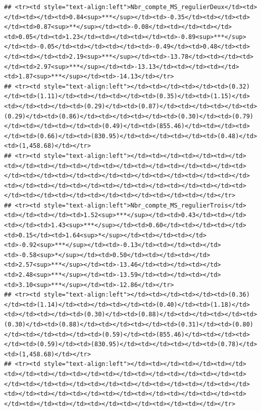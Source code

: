 \documentclass[
]{article}
\begin{document}
\begin{verbatim}
## <tr><td style="text-align:left">Nbr_compte_MS_regulierDeux</td><td></td><td></td><td>0.84<sup>***</sup></td><td>-0.35</td><td></td><td></td><td>0.87<sup>**</sup></td><td>-0.08</td><td></td><td></td><td>0.05</td><td>1.23</td><td></td><td></td><td>-0.89<sup>***</sup></td><td>-0.05</td><td></td><td></td><td>-0.49</td><td>0.48</td><td></td><td></td><td>2.19<sup>***</sup></td><td>-13.78</td><td></td><td></td><td>2.97<sup>***</sup></td><td>-13.13</td><td></td><td></td><td>1.87<sup>***</sup></td><td>-14.13</td></tr>
## <tr><td style="text-align:left"></td><td></td><td></td><td>(0.32)</td><td>(1.11)</td><td></td><td></td><td>(0.35)</td><td>(1.15)</td><td></td><td></td><td>(0.29)</td><td>(0.87)</td><td></td><td></td><td>(0.29)</td><td>(0.86)</td><td></td><td></td><td>(0.30)</td><td>(0.79)</td><td></td><td></td><td>(0.49)</td><td>(855.46)</td><td></td><td></td><td>(0.66)</td><td>(830.95)</td><td></td><td></td><td>(0.48)</td><td>(1,458.68)</td></tr>
## <tr><td style="text-align:left"></td><td></td><td></td><td></td><td></td><td></td><td></td><td></td><td></td><td></td><td></td><td></td><td></td><td></td><td></td><td></td><td></td><td></td><td></td><td></td><td></td><td></td><td></td><td></td><td></td><td></td><td></td><td></td><td></td><td></td><td></td><td></td><td></td></tr>
## <tr><td style="text-align:left">Nbr_compte_MS_regulierTrois</td><td></td><td></td><td>1.52<sup>***</sup></td><td>0.43</td><td></td><td></td><td>1.43<sup>***</sup></td><td>0.60</td><td></td><td></td><td>0.15</td><td>1.64<sup>*</sup></td><td></td><td></td><td>-0.92<sup>***</sup></td><td>-0.13</td><td></td><td></td><td>-0.58<sup>*</sup></td><td>0.50</td><td></td><td></td><td>2.57<sup>***</sup></td><td>-13.46</td><td></td><td></td><td>2.48<sup>***</sup></td><td>-13.59</td><td></td><td></td><td>3.10<sup>***</sup></td><td>-12.86</td></tr>
## <tr><td style="text-align:left"></td><td></td><td></td><td>(0.36)</td><td>(1.14)</td><td></td><td></td><td>(0.40)</td><td>(1.18)</td><td></td><td></td><td>(0.30)</td><td>(0.88)</td><td></td><td></td><td>(0.30)</td><td>(0.88)</td><td></td><td></td><td>(0.31)</td><td>(0.80)</td><td></td><td></td><td>(0.59)</td><td>(855.46)</td><td></td><td></td><td>(0.59)</td><td>(830.95)</td><td></td><td></td><td>(0.78)</td><td>(1,458.68)</td></tr>
## <tr><td style="text-align:left"></td><td></td><td></td><td></td><td></td><td></td><td></td><td></td><td></td><td></td><td></td><td></td><td></td><td></td><td></td><td></td><td></td><td></td><td></td><td></td><td></td><td></td><td></td><td></td><td></td><td></td><td></td><td></td><td></td><td></td><td></td><td></td><td></td></tr>

\end{verbatim}
\end{document}
